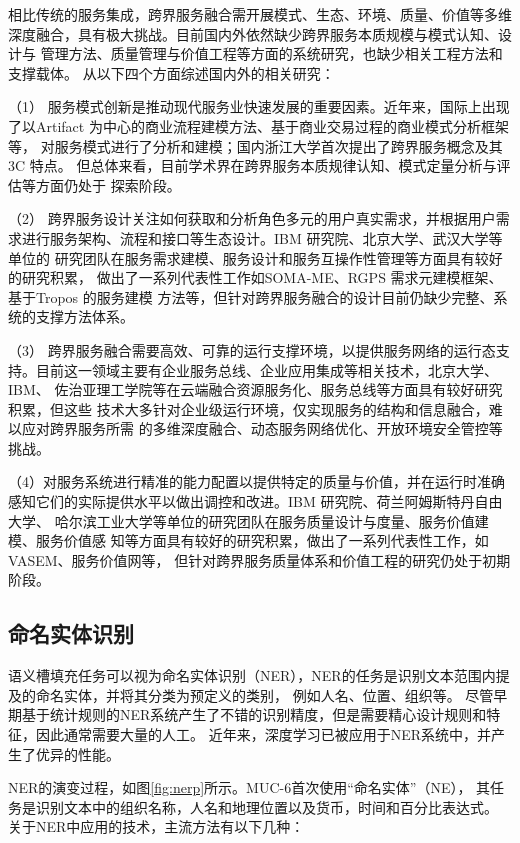相比传统的服务集成，跨界服务融合需开展模式、生态、环境、质量、价值等多维
深度融合，具有极大挑战。目前国内外依然缺少跨界服务本质规模与模式认知、设计与
管理方法、质量管理与价值工程等方面的系统研究，也缺少相关工程方法和支撑载体。
从以下四个方面综述国内外的相关研究：

（1） 服务模式创新是推动现代服务业快速发展的重要因素。近年来，国际上出现
了以Artifact 为中心的商业流程建模方法、基于商业交易过程的商业模式分析框架等，
对服务模式进行了分析和建模；国内浙江大学首次提出了跨界服务概念及其3C 特点。
但总体来看，目前学术界在跨界服务本质规律认知、模式定量分析与评估等方面仍处于
探索阶段。

（2） 跨界服务设计关注如何获取和分析角色多元的用户真实需求，并根据用户需
求进行服务架构、流程和接口等生态设计。IBM 研究院、北京大学、武汉大学等单位的
研究团队在服务需求建模、服务设计和服务互操作性管理等方面具有较好的研究积累，
做出了一系列代表性工作如SOMA-ME、RGPS 需求元建模框架、基于Tropos 的服务建模
方法等，但针对跨界服务融合的设计目前仍缺少完整、系统的支撑方法体系。

（3） 跨界服务融合需要高效、可靠的运行支撑环境，以提供服务网络的运行态支
持。目前这一领域主要有企业服务总线、企业应用集成等相关技术，北京大学、IBM、
佐治亚理工学院等在云端融合资源服务化、服务总线等方面具有较好研究积累，但这些
技术大多针对企业级运行环境，仅实现服务的结构和信息融合，难以应对跨界服务所需
的多维深度融合、动态服务网络优化、开放环境安全管控等挑战。

（4）对服务系统进行精准的能力配置以提供特定的质量与价值，并在运行时准确
感知它们的实际提供水平以做出调控和改进。IBM 研究院、荷兰阿姆斯特丹自由大学、
哈尔滨工业大学等单位的研究团队在服务质量设计与度量、服务价值建模、服务价值感
知等方面具有较好的研究积累，做出了一系列代表性工作，如VASEM、服务价值网等，
但针对跨界服务质量体系和价值工程的研究仍处于初期阶段。

\subsection{命名实体识别}
语义槽填充任务可以视为命名实体识别（NER），NER的任务是识别文本范围内提及的命名实体，并将其分类为预定义的类别，
例如人名、位置、组织等。
尽管早期基于统计规则的NER系统产生了不错的识别精度，但是需要精心设计规则和特征，因此通常需要大量的人工。
近年来，深度学习已被应用于NER系统中，并产生了优异的性能。

NER的演变过程，如图\ref{fig:nerp}所示。MUC-6首次使用“命名实体”（NE），
其任务是识别文本中的组织名称，人名和地理位置以及货币，时间和百分比表达式。
关于NER中应用的技术，主流方法有以下几种：

